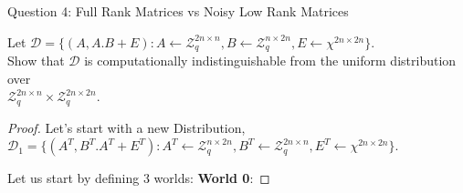 \begin{solution}{Question 4: Full Rank Matrices vs Noisy Low Rank Matrices}\label{ques:4}
    \begin{question}
    Let $\mathcal{D} = \{ (A,A.B +E) : A \leftarrow \mathcal{Z}_q^{2n\times n}, B \leftarrow \mathcal{Z}_q^{n\times 2n}, E \leftarrow \chi^{2n\times 2n} \}$.\\
    Show that $\mathcal{D}$ is computationally indistinguishable from the uniform distribution over \\ $\mathcal{Z}_q^{2n\times n} \times \mathcal{Z}_q^{2n\times2n}$.
    \end{question}
    \tcblower{}
    \begin{proof}
    Let's start with a new Distribution,\\ $\mathcal{D}_1 = \{ (A^T,B^T . A^T +E^T) : A^T \leftarrow \mathcal{Z}_q^{n\times 2n}, B^T \leftarrow \mathcal{Z}_q^{2n\times n}, E^T \leftarrow \chi^{2n\times 2n} \}$.

    Let us start by defining 3 worlds:
    \textbf{World 0}:
    
    
    \end{proof}
\end{solution}

